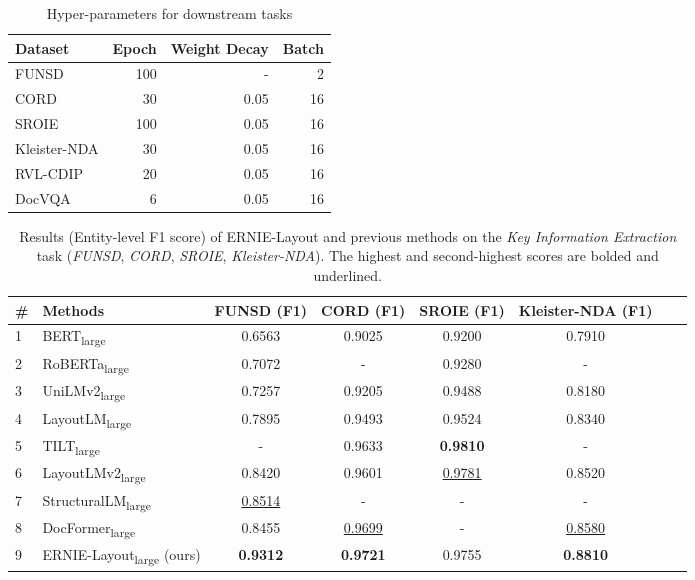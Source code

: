 \documentclass[11pt]{article}
\begin{document}
\begin{table}[t]
    \centering
    \small
    \begin{tabular}{lrrr}
    \toprule
    \textbf{Dataset} & \textbf{Epoch} & \textbf{Weight Decay} & \textbf{Batch} \\
    \midrule
    FUNSD & 100 & - & 2 \\
    CORD & 30 & 0.05 & 16 \\
    SROIE & 100 & 0.05 & 16 \\ 
    Kleister-NDA & 30 & 0.05 & 16 \\
    RVL-CDIP & 20 & 0.05 & 16 \\
    DocVQA & 6 & 0.05 & 16 \\ 
    \bottomrule
    \end{tabular}
    \caption{Hyper-parameters for downstream tasks}
    \label{tab:finetune_hyper_parameter}
\end{table}



\begin{table*}[t]
\centering
\small
\begin{tabular}{llcccccc}
\toprule
\# & \textbf{Methods} & \textbf{FUNSD} (F1) & \textbf{CORD} (F1) & \textbf{SROIE} (F1) & \textbf{Kleister-NDA} (F1) \\
\midrule
1 & BERT\textsubscript{large}~\cite{liu2019roberta}      & 0.6563 & 0.9025 & 0.9200 & 0.7910 \\
2 & RoBERTa\textsubscript{large}~\cite{liu2019roberta}   & 0.7072 & - & 0.9280 & -  \\
3 & UniLMv2\textsubscript{large}~\cite{bao2020unilmv2}   & 0.7257 & 0.9205 & 0.9488 & 0.8180  \\
\midrule
4 & LayoutLM\textsubscript{large}~\cite{xu2020layoutlm}            & 0.7895 & 0.9493 & 0.9524 & 0.8340 \\
5 & TILT\textsubscript{large}~\cite{powalski2021going}             & -      & 0.9633 & \textbf{0.9810} & - \\
6 & LayoutLMv2\textsubscript{large}~\cite{xu2021layoutlmv2}        & 0.8420 & 0.9601 & \underline{0.9781} & 0.8520 \\
7 & StructuralLM\textsubscript{large}~\cite{li2021structurallm}    & \underline{0.8514} & -      & -      & - \\
8 & DocFormer\textsubscript{large}~\cite{appalaraju2021docformer}  & 0.8455 & \underline{0.9699} & -      & \underline{0.8580} \\
\midrule
\midrule
9 & ERNIE-Layout\textsubscript{large} (ours)  & \textbf{0.9312} & \textbf{0.9721} & 0.9755 & \textbf{0.8810} \\ 
\bottomrule
\end{tabular}
\caption{Results (Entity-level F1 score) of ERNIE-Layout and previous methods on the \emph{Key Information Extraction} task (\emph{FUNSD}, \emph{CORD}, \emph{SROIE}, \emph{Kleister-NDA}). The highest and second-highest scores are bolded and underlined.}
\label{tab:main_result_ner}
\end{table*}
\end{document}
